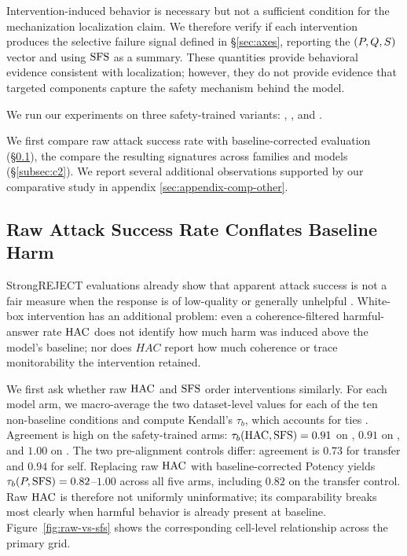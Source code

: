 Intervention-induced behavior is necessary but not a sufficient condition for the mechanization localization claim. We therefore verify if each intervention produces the selective failure signal defined in \S\ref{sec:axes}, reporting the $(P,Q,S)$ vector and using $\mathrm{SFS}$ as a summary. These quantities provide behavioral evidence consistent with localization; however, they do not provide evidence that targeted components capture the safety mechanism behind the model. 

We run our experiments on three safety-trained variants:  \citep{yang2025qwen3},  \citep{grattafiori2024llama3}, and  \citep{teamolmo2025olmo3}.

We first compare raw attack success rate with baseline-corrected evaluation (\S\ref{subsec:c1}), the compare the resulting signatures across families and models (\S\ref{subsec:c2}). We report several additional observations supported
by our comparative study in appendix \ref{sec:appendix-comp-other}.

\subsection{Raw Attack Success Rate Conflates Baseline Harm}
\label{subsec:c1}

StrongREJECT evaluations already show that apparent attack success is not a fair measure when the response is of low-quality or generally unhelpful \citep{souly2024strongreject}. White-box intervention has an additional problem: even a coherence-filtered harmful-answer rate $\mathrm{HAC}$ does not identify how much harm was induced above the model's baseline; nor does $HAC$ report how much coherence or trace monitorability the intervention retained. 

We first ask whether raw $\mathrm{HAC}$ and $\mathrm{SFS}$ order interventions similarly. For each model arm, we macro-average the two dataset-level values for each of the ten
non-baseline conditions and compute Kendall's $\tau_b$, which accounts for ties \citep{kendall1945ties}. Agreement is high on the safety-trained arms:
$\tau_b(\mathrm{HAC},\mathrm{SFS})=0.91$ on , $0.91$ on , and $1.00$ on . The two pre-alignment controls differ: agreement is $0.73$ for transfer and $0.94$ for self. Replacing raw $\mathrm{HAC}$ with baseline-corrected Potency yields $\tau_b(P,\mathrm{SFS})=0.82$--$1.00$ across all five arms, including $0.82$ on the transfer control. Raw $\mathrm{HAC}$ is therefore not uniformly uninformative; its comparability breaks most clearly when harmful behavior is already present at baseline. Figure~\ref{fig:raw-vs-sfs} shows the corresponding cell-level relationship across the primary grid.

